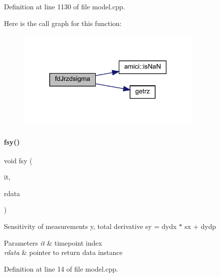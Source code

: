 Definition at line 1130 of file model.\+cpp.

Here is the call graph for this function\+:
\nopagebreak
\begin{figure}[H]
\begin{center}
\leavevmode
\includegraphics[width=258pt]{classamici_1_1_model_a3e6a11cdaa35b6e85d013eb9f63564d2_cgraph}
\end{center}
\end{figure}
\mbox{\label{classamici_1_1_model_a6b1c331013c5947e77129cb4da82713e}} 
\paragraph{\texorpdfstring{fsy()}{fsy()}}
{\footnotesize\ttfamily void fsy (\begin{DoxyParamCaption}\item[{const int}]{it,  }\item[{\mbox{\hyperlink{classamici_1_1_return_data}{Return\+Data}} $\ast$}]{rdata }\end{DoxyParamCaption})}

Sensitivity of measurements y, total derivative sy = dydx $\ast$ sx + dydp 
\begin{DoxyParams}{Parameters}
{\em it} & timepoint index \\
\hline
{\em rdata} & pointer to return data instance \\
\hline
\end{DoxyParams}


Definition at line 14 of file model.\+cpp.

